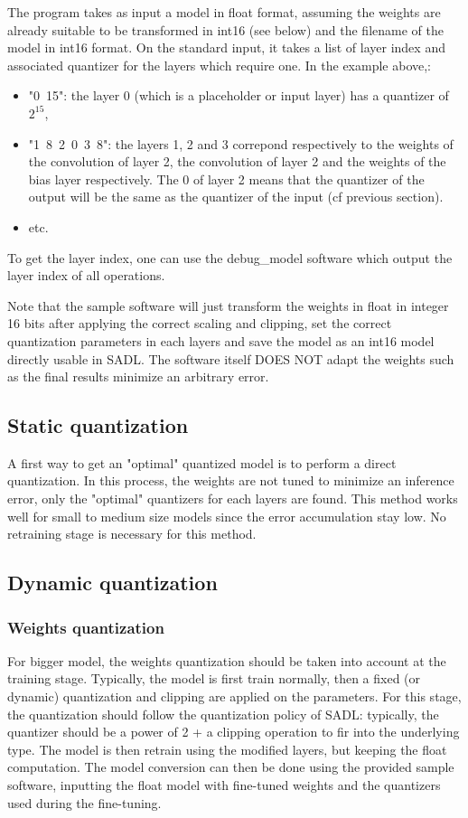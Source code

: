 \documentclass[10pt,a4paper]{article}
\begin{document}
The program takes as input a model in float format, assuming the weights are already suitable to be transformed in int16 (see below) and the filename of the model in int16 format.
On the standard input, it takes a list of layer index and associated quantizer for the layers which require one.
In the example above,:
\begin{itemize}
\item "0\ 15": the layer 0 (which is a placeholder or input layer) has a quantizer of $2^{15}$,
\item "1\ 8\ 2\ 0\ 3\ 8": the layers 1, 2 and 3 correpond respectively to the weights of the convolution of layer 2, the convolution of layer 2 and the weights of the bias layer respectively. The 0 of layer 2 means that the quantizer of the output will be the same as the quantizer of the input (cf previous section).
\item etc.
\end{itemize}

To get the layer index, one can use the debug\_model software which output the layer index of all operations.

Note that the sample software will just transform the weights in float in integer 16 bits after applying the correct scaling and clipping, set the correct quantization parameters in each layers and save the model as an int16 model directly usable in SADL. The software itself DOES NOT adapt the weights such as the final results minimize an arbitrary error. 

\subsection{Static quantization}
A first way to get an "optimal" quantized model is to perform a direct quantization. In this process, the weights are not tuned to minimize an inference error, only the "optimal" quantizers for each layers are found. This method works well for small to medium size models since the error accumulation stay low.
No retraining stage is necessary for this method.

\subsection{Dynamic quantization}
\subsubsection{Weights quantization}
For bigger model, the weights quantization should be taken into account at the training stage. Typically, the model is first train normally, then a fixed (or dynamic) quantization and clipping are applied on the parameters. For this stage, the quantization should follow the quantization policy of SADL: typically, the quantizer should be a power of 2 + a clipping operation to fir into the underlying type.
The model is then retrain using the modified layers, but keeping the float computation.
The model conversion can then be done using the provided sample software, inputting the float model with fine-tuned weights and the quantizers used during the fine-tuning.
\end{document}
